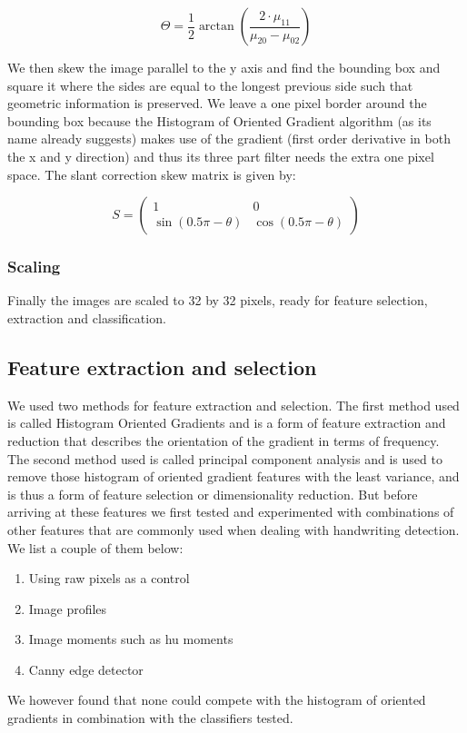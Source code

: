 \documentclass[%
        compressed,
        final,
        notitlepage,
        narroweqnarray,
        inline,
        twoside,
        ]{ieee}
\begin{document}
\begin{equation}
    \Theta = \frac{1}{2} \arctan \left(
        \frac{2 \cdot \mu_{11}}{\mu_{20} - \mu_{02}}
    \right)
\end{equation}

We then skew the image parallel to the y axis and find the bounding box and square it where the sides are equal to the longest previous side such that geometric information is preserved. We leave a one pixel border around the bounding box because the Histogram of Oriented Gradient algorithm (as its name already suggests) makes use of the gradient (first order derivative in both the x and y direction) and thus its three part filter needs the extra one pixel space. The slant correction skew matrix is given by:

\begin{equation}
    S = \begin{pmatrix}
        1 & 0 \\
        \sin(0.5 \pi - \theta) & \cos(0.5 \pi - \theta)
    \end{pmatrix}
\end{equation}

\subsubsection{Scaling}
Finally the images are scaled to 32 by 32 pixels, ready for feature selection, extraction and classification.
\subsection{Feature extraction and selection}
We used two methods for feature extraction and selection. The first method used
is called Histogram Oriented Gradients and is a form of feature extraction and
reduction that describes the orientation of the gradient in terms of frequency. The second method used is called principal component analysis and is used to remove those histogram of oriented gradient features with the least variance, and is thus a form of feature selection or dimensionality reduction. But before arriving at these features we first tested and experimented with combinations of other features that are commonly used when dealing with handwriting detection. We list a couple of them below:\\

    \begin{enumerate}
        \item Using raw pixels as a control
        \item Image profiles
        \item Image moments such as hu moments
        \item Canny edge detector\\
    \end{enumerate}
We however found that none could compete with the histogram of oriented gradients in combination with the classifiers tested.
\end{document}

